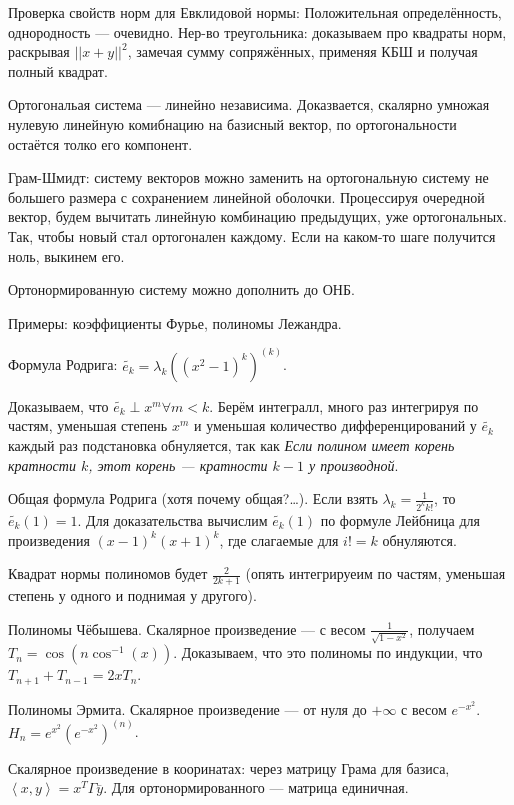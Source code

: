 \documentclass[12pt, a4paper]{article}
\begin{document}
Проверка свойств норм для Евклидовой нормы:
Положительная определённость, однородность — очевидно. 
Нер-во треугольника: доказываем про квадраты норм, раскрывая $||x + y||^2$, замечая сумму сопряжённых, применяя КБШ и получая полный квадрат.

Ортогональая система — линейно независима. Доказвается, скалярно умножая нулевую линейную комибнацию на базисный вектор, 
по ортогональности остаётся толко его компонент. 


Грам-Шмидт: систему векторов можно заменить на ортогональную систему не большего размера с сохранением линейной оболочки.
Процессируя очередной вектор, будем вычитать линейную комбинацию предыдущих, уже ортогональных. Так, чтобы новый стал ортогонален каждому.
Если на каком-то шаге получится ноль, выкинем его.

Ортонормированную систему можно дополнить до ОНБ.

Примеры: коэффициенты Фурье, полиномы Лежандра.

Формула Родрига: $\tilde{e_k} = \lambda_k \left( (x^2 - 1)^k \right)^(k)$.

Доказываем, что $\tilde{e_k} \perp x^m \forall m < k$. Берём интегралл, много раз интегрируя по частям, уменьшая степень $x^m$ и уменьшая количество дифференцирований у $\tilde{e_k}$
каждый раз подстановка обнуляется, так как \textit{Если полином имеет корень кратности $k$, этот корень — кратности $k - 1$ у производной}.

Общая формула Родрига (хотя почему общая?…). Если взять $\lambda_k = \frac{1}{2^k k!}$, то $\tilde{e_k}(1) = 1$. 
Для доказательства вычислим $\tilde{e_k}(1)$ по формуле Лейбница для произведения $(x - 1)^k (x + 1)^k$, где слагаемые для $i != k$ обнуляются.

Квадрат нормы полиномов будет $\frac{2}{2k + 1}$ (опять интегрируеим по частям, уменьшая степень у одного и поднимая у другого).

Полиномы Чёбышева. Скалярное произведение — с весом $\frac{1}{\sqrt{1 - x^2}}$, получаем $T_n = \cos(n \cos^{-1}(x))$.
Доказываем, что это полиномы по индукции, что $T_{n + 1} + T_{n - 1} = 2x T_n$.

Полиномы Эрмита. Скалярное произведение — от нуля до $+\infty$ с весом $e^{-x^2}$.
$H_n = e^{x^2} \left( e^{-x^2} \right)^(n)$.

Скалярное произведение в кооринатах: через матрицу Грама для базиса, $\left\langle x, y \right\rangle = x^T \Gamma \overline{y}$.
Для ортонормированного — матрица единичная.
\end{document}
